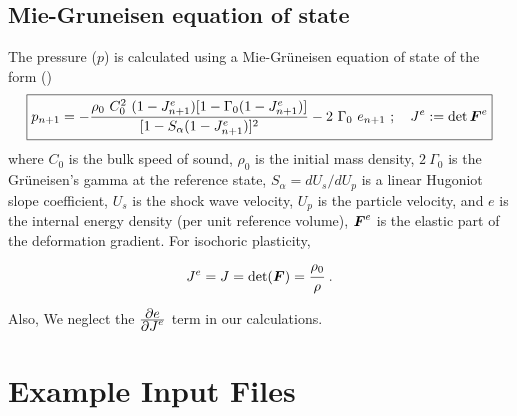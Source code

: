 \subsection{Mie-Gruneisen equation of state}
The pressure ($p$) is calculated using a Mie-Gr{\"u}neisen equation of state 
of the form (\cite{Wilkins99,Zocher00})
\begin{equation} \label{eq:EOSMG}
  \boxed{
  p_{n+1} =  - \frac{\rho_0~C_0^2~(1 - J^e_{n+1})
           [1 - \Gamma_0 (1 - J^e_{n+1})]}
           {[1 - S_{\alpha}(1 - J^e_{n+1})]^2} - 2~\Gamma_0~e_{n+1} 
  ~;~~~ J^e := \det{\BF^e} 
  }
\end{equation}
where $C_0$ is the bulk speed of sound, $\rho_0$ is the initial mass density,
$2~\Gamma_0$ is the Gr{\"u}neisen's gamma at the reference state,
$S_{\alpha} = dU_s/dU_p$ is a linear Hugoniot slope coefficient,
$U_s$ is the shock wave velocity, $U_p$ is the particle velocity, and
$e$ is the internal energy density (per unit reference volume), $\BF^e$ is
the elastic part of the deformation gradient.  For isochoric plasticity,
\begin{equation*}
  J^e = J = \det(\BF) = \cfrac{\rho_0}{\rho} ~.
\end{equation*}

Also,
\Beq
\Eeq
We neglect the $\Partial{e}{J^e}$ term in our calculations.

  \section{Example Input Files}
